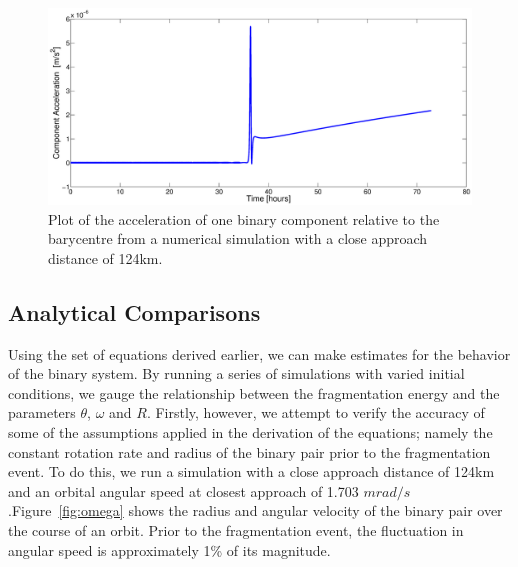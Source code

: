\documentclass[letterpaper, preprint, paper,11pt]{AAS}	%
\begin{document}
 \begin{figure}[H]
\centering
\centerline{\includegraphics[width=1.2\textwidth]{peak_accel.eps}} 
\caption{Plot of the acceleration of one binary component relative to the barycentre from a numerical simulation
 with a close approach distance of 124km.} 
\label{fig:Num_accell}
\end{figure}

\subsection{Analytical Comparisons}

Using the set of equations derived earlier, we can make estimates for the behavior of the binary system. By running a series of simulations with varied initial conditions, we gauge the relationship between the fragmentation energy and the parameters $\theta$, $\omega$ and $R$. Firstly, however, we attempt to verify the accuracy of some of the assumptions applied in the derivation of the equations; namely the constant rotation rate and radius of the binary pair prior to the fragmentation event. To do this, we run a simulation with a close approach distance of 124km and an orbital angular speed at closest approach of 1.703 $mrad/s$.Figure~\ref{fig:omega} shows the radius and angular velocity of the binary pair over the course of an orbit. Prior to the fragmentation event, the fluctuation in angular speed is approximately 1\% of its magnitude.
\end{document}
